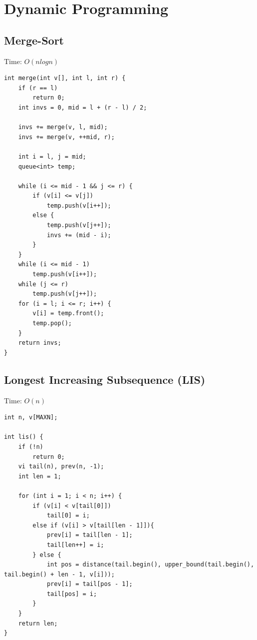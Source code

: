 \documentclass[oneside]{article}
\begin{document}
\section{Dynamic Programming}

\subsection{Merge-Sort}
Time: $O(nlogn)$
\begin{lstlisting}
int merge(int v[], int l, int r) {
    if (r == l)
        return 0;
    int invs = 0, mid = l + (r - l) / 2;

    invs += merge(v, l, mid);
    invs += merge(v, ++mid, r);

    int i = l, j = mid;
    queue<int> temp;

    while (i <= mid - 1 && j <= r) {
        if (v[i] <= v[j])
            temp.push(v[i++]);
        else {
            temp.push(v[j++]);
            invs += (mid - i);
        }
    }
    while (i <= mid - 1)
        temp.push(v[i++]);
    while (j <= r)
        temp.push(v[j++]);
    for (i = l; i <= r; i++) {
        v[i] = temp.front();
        temp.pop();
    }
    return invs;
}
\end{lstlisting}

\subsection{Longest Increasing Subsequence (LIS)}
Time: $O(n)$
\begin{lstlisting}
int n, v[MAXN];

int lis() {
    if (!n)
        return 0;
    vi tail(n), prev(n, -1);
    int len = 1;

    for (int i = 1; i < n; i++) {
        if (v[i] < v[tail[0]])
            tail[0] = i;
        else if (v[i] > v[tail[len - 1]]){
            prev[i] = tail[len - 1];
            tail[len++] = i;
        } else {
            int pos = distance(tail.begin(), upper_bound(tail.begin(), tail.begin() + len - 1, v[i]));
            prev[i] = tail[pos - 1];
            tail[pos] = i;
        }
    }
    return len;
}
\end{lstlisting}
\end{document}
